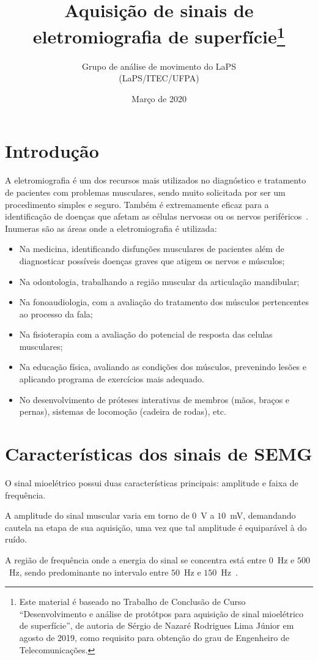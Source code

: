 \documentclass[a4paper,11pt]{article}
\title{Aquisição de sinais de eletromiografia de superfície\footnote{Este material é baseado no Trabalho de Conclusão de Curso ``Desenvolvimento e análise de protótpos para aquisição de sinal mioelétrico de superfície'', de autoria de Sérgio de Nazaré Rodrigues Lima Júnior em agosto de 2019, como requisito para obtenção do grau de Engenheiro de Telecomunicações.}}
\author{Grupo de análise de movimento do LaPS\\
        (LaPS/ITEC/UFPA)}
\date{Março de 2020}
\begin{document}
\maketitle

\section{Introdução}
\label{sec:intro}
A eletromiografia é um dos recursos mais utilizados no diagnóstico e tratamento de pacientes com problemas musculares, sendo muito solicitada por ser um procedimento simples e seguro. Também é extremamente eficaz para a identificação de doenças que afetam as células nervosas ou os nervos periféricos~\parencite{MIOTEC2019}. Inumeras são as áreas onde a eletromiografia é utilizada:
\begin{itemize}
   \item Na medicina, identificando disfunções musculares de pacientes além de diagnosticar possíveis doenças graves que atigem os nervos e músculos;
   \item Na odontologia, trabalhando a região muscular da articulação mandibular;
   \item Na fonoaudiologia, com a avaliação do tratamento dos músculos pertencentes ao processo da fala;
   \item Na fisioterapia com a avaliação do potencial de resposta das celulas musculares;
   \item Na educação física, avaliando as condições dos músculos, prevenindo lesões e aplicando programa de exercícios mais adequado.
   \item No desenvolvimento de próteses interativas de membros (mãos, braços e pernas), sistemas de locomoção (cadeira de rodas), etc.
\end{itemize}

\section{Características dos sinais de SEMG}
\label{sec:carac}
O sinal mioelétrico possui duas características principais: amplitude e faixa de frequência.

A amplitude do sinal muscular varia em torno de $0$~V a $10$~mV, demandando cautela na etapa de sua aquisição, uma vez que tal amplitude é equiparável à do ruído. %

A região de frequência onde a energia do sinal se concentra está entre $0$~Hz e $500$~Hz, sendo predominante no intervalo entre $50$~Hz e $150$~Hz~\parencite{DELUCA2002}.
\end{document}
